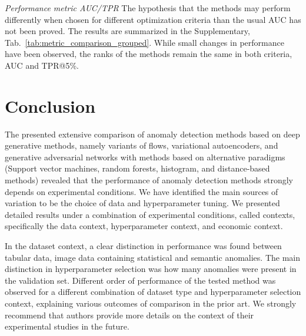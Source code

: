 \emph{Performance metric AUC/TPR} The hypothesis that the methods may perform differently when chosen for different optimization criteria than the usual AUC has not been proved. The results are summarized in the Supplementary, Tab.~\ref{tab:metric_comparison_grouped}. While small changes in performance have been observed, the ranks of the methods remain the same in both criteria, AUC and TPR@5\%. 

\section{Conclusion}
The presented extensive comparison of anomaly detection methods based on deep generative methods, namely variants of flows, variational autoencoders, and generative adversarial networks with methods based on alternative paradigms (Support vector machines, random forests, histogram, and distance-based methods) revealed that the performance of anomaly detection methods strongly depends on experimental conditions. We have identified the main sources of variation to be the choice of data and hyperparameter tuning. We presented detailed results under a combination of experimental conditions, called contexts, specifically the data context, hyperparameter context, and economic context. 

In the dataset context, a clear distinction in performance was found between tabular data, image data containing statistical and semantic anomalies. The main distinction in hyperparameter selection was how many anomalies were present in the validation set. Different order of performance of the tested method was observed for a different combination of dataset type and hyperparameter selection context, explaining various outcomes of comparison in the prior art. We strongly recommend that authors provide more details on the context of their experimental studies in the future.

